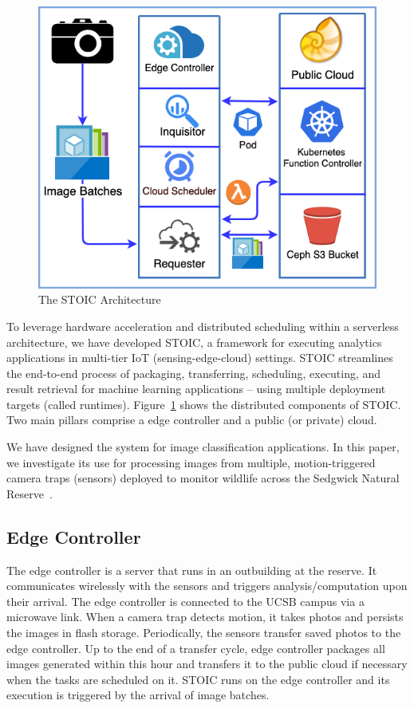 \begin{figure}
    \centering
    \includegraphics[scale=0.4]{figures/STOIC.png}
    \caption{The STOIC Architecture \label{fig:STOIC}}
\end{figure}

To leverage hardware acceleration and distributed scheduling within a serverless architecture, we have developed STOIC, a framework for executing analytics applications in multi-tier IoT (sensing-edge-cloud) settings. STOIC streamlines the end-to-end process of packaging, transferring, scheduling, executing, and result retrieval for machine learning applications -- using multiple deployment targets (called runtimes). Figure~\ref{fig:STOIC} shows the distributed components of STOIC. Two main pillars comprise a edge controller and a public (or private) cloud.

We have designed the system for image classification applications. In this paper, we investigate its use for processing images from multiple, motion-triggered camera traps (sensors) deployed to monitor wildlife across the Sedgwick Natural Reserve~\cite{ref:sedgwick}.

\subsection{Edge Controller}
The edge controller is a server that runs in an outbuilding at the reserve. It communicates wirelessly with the sensors and triggers analysis/computation upon their arrival. The edge controller is connected to the UCSB campus via a microwave link. When a camera trap detects motion, it takes photos and persists the images in flash storage. Periodically, the sensors transfer saved photos to the edge controller. Up to the end of a transfer cycle, edge controller packages all images generated within this hour and transfers it to the public cloud if necessary when the tasks are scheduled on it. STOIC runs on the edge controller and its execution is triggered by the arrival of image batches. 

